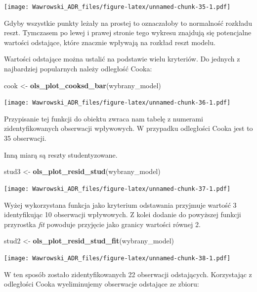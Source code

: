 \documentclass[]{book}
\newenvironment{Shaded}{\begin{snugshade}}{\end{snugshade}}
\newcommand{\KeywordTok}[1]{\textcolor[rgb]{0.13,0.29,0.53}{\textbf{#1}}}
\newcommand{\NormalTok}[1]{#1}
\newcommand{\StringTok}[1]{\textcolor[rgb]{0.31,0.60,0.02}{#1}}
\begin{document}
\texttt{[image: Wawrowski\_ADR\_files/figure-latex/unnamed-chunk-35-1.pdf]}

Gdyby wszystkie punkty leżały na prostej to oznaczałoby to normalność rozkładu reszt. Tymczasem po lewej i prawej stronie tego wykresu znajdują się potencjalne wartości odstające, które znacznie wpływają na rozkład reszt modelu.

Wartości odstające można ustalić na podstawie wielu kryteriów. Do jednych z najbardziej popularnych należy odległość Cooka:

\begin{Shaded}
\begin{Highlighting}[]
\NormalTok{cook <-}\StringTok{ }\KeywordTok{ols_plot_cooksd_bar}\NormalTok{(wybrany_model)}
\end{Highlighting}
\end{Shaded}

\texttt{[image: Wawrowski\_ADR\_files/figure-latex/unnamed-chunk-36-1.pdf]}

Przypisanie tej funkcji do obiektu zwraca nam tabelę z numerami zidentyfikowanych obserwacji wpływowych. W przypadku odległości Cooka jest to 35 obserwacji.

Inną miarą są reszty studentyzowane.

\begin{Shaded}
\begin{Highlighting}[]
\NormalTok{stud3 <-}\StringTok{ }\KeywordTok{ols_plot_resid_stud}\NormalTok{(wybrany_model)}
\end{Highlighting}
\end{Shaded}

\texttt{[image: Wawrowski\_ADR\_files/figure-latex/unnamed-chunk-37-1.pdf]}

Wyżej wykorzystana funkcja jako kryterium odstawania przyjmuje wartość 3 identyfikując 10 obserwacji wpływowych. Z kolei dodanie do powyższej funkcji przyrostka \emph{fit} powoduje przyjęcie jako granicy wartości równej 2.

\begin{Shaded}
\begin{Highlighting}[]
\NormalTok{stud2 <-}\StringTok{ }\KeywordTok{ols_plot_resid_stud_fit}\NormalTok{(wybrany_model)}
\end{Highlighting}
\end{Shaded}

\texttt{[image: Wawrowski\_ADR\_files/figure-latex/unnamed-chunk-38-1.pdf]}

W ten sposób zostało zidentyfikowanych 22 obserwacji odstających. Korzystając z odległości Cooka wyeliminujemy obserwacje odstające ze zbioru:
\end{document}
